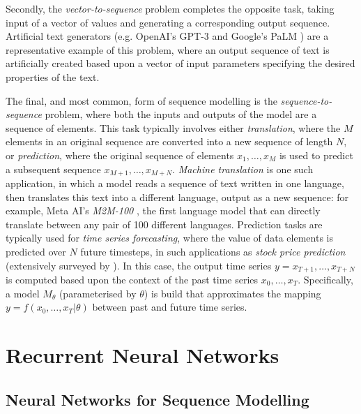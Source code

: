 \documentclass[a4paper, 11pt]{report}
\begin{document}
    Secondly, the \emph{vector-to-sequence} problem completes the opposite task, taking input of a vector of values and generating a corresponding output sequence. Artificial text generators (e.g. OpenAI's GPT-3 \citep{brown-2020} and Google's PaLM \citep{chowdhery-2022}) are a representative example of this problem, where an output sequence of text is artificially created based upon a vector of input parameters specifying the desired properties of the text.

    The final, and most common, form of sequence modelling is the \emph{sequence-to-sequence} problem, where both the inputs and outputs of the model are a sequence of elements. This task typically involves either \emph{translation}, where the $M$ elements in an original sequence are converted into a new sequence of length $N$, or \emph{prediction}, where the original sequence of elements $x_1, \ldots, x_M$ is used to predict a subsequent sequence $x_{M+1}, \ldots, x_{M+N}$. \emph{Machine translation} is one such application, in which a model reads a sequence of text written in one language, then translates this text into a different language, output as a new sequence: for example, Meta AI's \emph{M2M-100} \citep{fan-2020}, the first language model that can directly translate between any pair of 100 different languages. Prediction tasks are typically used for \emph{time series forecasting}, where the value of data elements is predicted over $N$ future timesteps, in such applications as \emph{stock price prediction} (extensively surveyed by \citet{sezer-2019}). In this case, the output time series $y = x_{T+1}, \ldots, x_{T+N}$ is computed based upon the context of the past time series $x_0, \ldots, x_T$. Specifically, a model $M_{\theta}$ (parameterised by $\theta$) is build that approximates the mapping $y = f( x_0, \ldots, x_T \vert \theta )$ between past and future time series.

    \section{Recurrent Neural Networks}

    \subsection{Neural Networks for Sequence Modelling}
\end{document}
